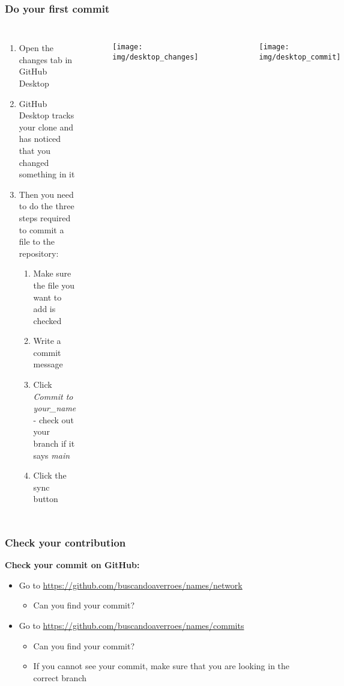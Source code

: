 \documentclass[aspectratio=169]{beamer} %
\newcommand{\trainingURL}[1]{{\color{blue}\url{#1}}}
\newcommand{\traininerUsername}{buscandoaverroes}
\newcommand{\repoName}{\traininerUsername/names}
\newcommand{\trainingRepoURL}[1]{\trainingURL{https://github.com/\repoName #1}}
\begin{document}
\begin{frame}
\frametitle{Do your first commit}

\begin{columns}[c]


\begin{enumerate}
	\item Open the changes tab in GitHub Desktop
	\item GitHub Desktop tracks your clone and has noticed that you changed something in it
	\item Then you need to do the three steps required to commit a file to the repository:
	\begin{enumerate}
		\item Make sure the file you want to add is checked
		\item Write a commit message
		\item Click \textit{Commit to your\_name} - check out your branch if it says \textit{main}
		\item Click the sync button
	\end{enumerate}
\end{enumerate}

\begin{figure}
	\centering
	\texttt{[image: img/desktop\_changes]}
	\label{fig:desktopchanges}
\end{figure}

\vspace{-1cm}

\begin{figure}
	\centering
	\texttt{[image: img/desktop\_commit]}
	\label{fig:desktop_commit}
\end{figure}

\end{columns}

\end{frame}

\begin{frame}
\frametitle{Check your contribution}

	\textbf{Check your commit on GitHub:}
	\begin{itemize}
		\item Go to \trainingRepoURL{/network}
		\begin{itemize}
			\item Can you find your commit?
		\end{itemize}
		\item Go to \trainingRepoURL{/commits}
		\begin{itemize}
			\item Can you find your commit?
			\item If you cannot see your commit, make sure that you are looking in the correct branch
		\end{itemize}
	\end{itemize}

\end{frame}
\end{document}
